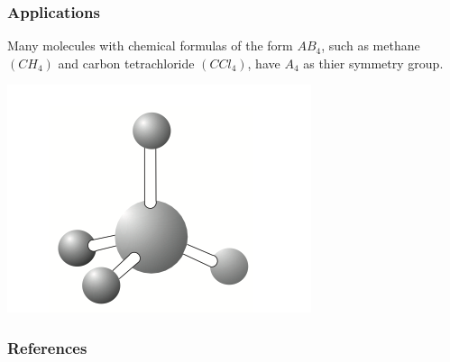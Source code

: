 \documentclass{beamer}
\begin{document}
\begin{frame}
    \frametitle{Applications}

    Many molecules with chemical formulas of the form \(AB_4\), such as methane \((CH_4)\) and carbon tetrachloride \((CCl_4)\), have \(A_4\) as thier symmetry group. 

    \includegraphics[scale=0.5]{Figures/fig_4.png}

\end{frame}







\begin{frame}
    \frametitle{References}
\end{frame}
\end{document}
